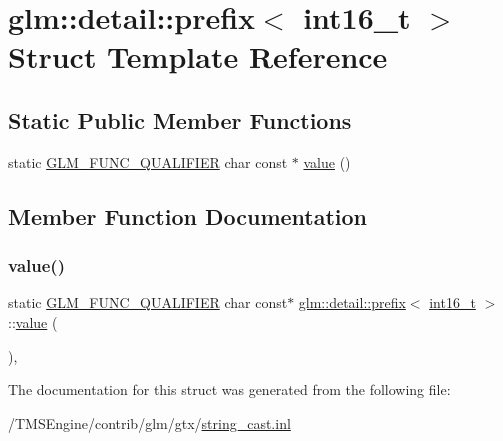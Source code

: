 \hypertarget{structglm_1_1detail_1_1prefix_3_01int16__t_01_4}{}\section{glm\+:\+:detail\+:\+:prefix$<$ int16\+\_\+t $>$ Struct Template Reference}
\label{structglm_1_1detail_1_1prefix_3_01int16__t_01_4}
\subsection*{Static Public Member Functions}
\begin{DoxyCompactItemize}
\item 
static \hyperlink{setup_8hpp_a33fdea6f91c5f834105f7415e2a64407}{G\+L\+M\+\_\+\+F\+U\+N\+C\+\_\+\+Q\+U\+A\+L\+I\+F\+I\+ER} char const  $\ast$ \hyperlink{structglm_1_1detail_1_1prefix_3_01int16__t_01_4_a0ccbfcd8a1f5a2b777dbc43bad141bb6}{value} ()
\end{DoxyCompactItemize}


\subsection{Member Function Documentation}
\mbox{\label{structglm_1_1detail_1_1prefix_3_01int16__t_01_4_a0ccbfcd8a1f5a2b777dbc43bad141bb6}} 
\subsubsection{\texorpdfstring{value()}{value()}}
{\footnotesize\ttfamily static \hyperlink{setup_8hpp_a33fdea6f91c5f834105f7415e2a64407}{G\+L\+M\+\_\+\+F\+U\+N\+C\+\_\+\+Q\+U\+A\+L\+I\+F\+I\+ER} char const$\ast$ \hyperlink{structglm_1_1detail_1_1prefix}{glm\+::detail\+::prefix}$<$ \hyperlink{group__gtc__type__precision_gaf89ee61e0d34aa4a462104b7ae7f2da6}{int16\+\_\+t} $>$\+::\hyperlink{_s_d_l__opengl__glext_8h_a8ad81492d410ff2ac11f754f4042150f}{value} (\begin{DoxyParamCaption}{ }\end{DoxyParamCaption})\hspace{0.3cm}{\ttfamily [inline]}, {\ttfamily [static]}}



The documentation for this struct was generated from the following file\+:\begin{DoxyCompactItemize}
\item 
/\+T\+M\+S\+Engine/contrib/glm/gtx/\hyperlink{string__cast_8inl}{string\+\_\+cast.\+inl}\end{DoxyCompactItemize}
